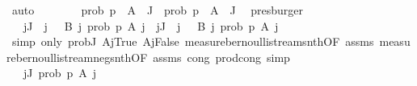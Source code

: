 \begin{isabellebody}
\ auto\isanewline
\ \ \ \ \ \ \isamarkupfalse%
\ {\isachardoublequoteopen}prob\ p\ {\isacharparenleft}{\kern0pt}{\isasymInter}\ {\isacharparenleft}{\kern0pt}A\ {\isacharbackquote}{\kern0pt}\ J{\isacharparenright}{\kern0pt}{\isacharparenright}{\kern0pt}\ {\isacharequal}{\kern0pt}\ prob\ p\ {\isacharparenleft}{\kern0pt}{\isasymInter}\ {\isacharparenleft}{\kern0pt}A\ {\isacharbackquote}{\kern0pt}\ J{\isacharprime}{\kern0pt}{\isacharparenright}{\kern0pt}{\isacharparenright}{\kern0pt}{\isachardoublequoteclose}\ \isamarkupfalse%
\ presburger\isanewline
\ \ \ \ \ \ \isamarkupfalse%
\ \isamarkupfalse%
\ {\isachardoublequoteopen}{\isachardot}{\kern0pt}{\isachardot}{\kern0pt}{\isachardot}{\kern0pt}\ {\isacharequal}{\kern0pt}\ {\isacharparenleft}{\kern0pt}{\isasymProd}j{\isasymin}J{\isacharprime}{\kern0pt}\ {\isasyminter}\ {\isacharbraceleft}{\kern0pt}j{\isachardot}{\kern0pt}\ {}\ {\isasymin}\ B\ j{\isacharbraceright}{\kern0pt}{\isachardot}{\kern0pt}\ prob\ p\ {\isacharparenleft}{\kern0pt}A\ j{\isacharparenright}{\kern0pt}{\isacharparenright}{\kern0pt}\ {\isacharasterisk}{\kern0pt}\ {\isacharparenleft}{\kern0pt}{\isasymProd}j{\isasymin}J{\isacharprime}{\kern0pt}\ {\isacharminus}{\kern0pt}\ {\isacharbraceleft}{\kern0pt}j{\isachardot}{\kern0pt}\ {}\ {\isasymin}\ B\ j{\isacharbraceright}{\kern0pt}{\isachardot}{\kern0pt}\ prob\ p\ {\isacharparenleft}{\kern0pt}A\ j{\isacharparenright}{\kern0pt}{\isacharparenright}{\kern0pt}{\isachardoublequoteclose}\ \isanewline
\ \ \ \ \ \ \ \ \isamarkupfalse%
\ {\isacharparenleft}{\kern0pt}simp\ only{\isacharcolon}{\kern0pt}\ prob{\isacharunderscore}{\kern0pt}J{\isacharprime}{\kern0pt}\ A{\isacharunderscore}{\kern0pt}j{\isacharunderscore}{\kern0pt}True\ A{\isacharunderscore}{\kern0pt}j{\isacharunderscore}{\kern0pt}False\ measure{\isacharunderscore}{\kern0pt}bernoulli{\isacharunderscore}{\kern0pt}stream{\isacharunderscore}{\kern0pt}snth{\isacharbrackleft}{\kern0pt}OF\ assms{\isacharbrackright}{\kern0pt}\ measure{\isacharunderscore}{\kern0pt}bernoulli{\isacharunderscore}{\kern0pt}stream{\isacharunderscore}{\kern0pt}neg{\isacharunderscore}{\kern0pt}snth{\isacharbrackleft}{\kern0pt}OF\ assms{\isacharbrackright}{\kern0pt}\ cong{\isacharcolon}{\kern0pt}\ prod{\isachardot}{\kern0pt}cong{\isacharparenright}{\kern0pt}\ simp\isanewline
\ \ \ \ \ \ \isamarkupfalse%
\ \isamarkupfalse%
\ {\isachardoublequoteopen}{\isachardot}{\kern0pt}{\isachardot}{\kern0pt}{\isachardot}{\kern0pt}\ {\isacharequal}{\kern0pt}\ {\isacharparenleft}{\kern0pt}{\isasymProd}j{\isasymin}J{\isacharprime}{\kern0pt}{\isachardot}{\kern0pt}\ prob\ p\ {\isacharparenleft}{\kern0pt}A\ j{\isacharparenright}{\kern0pt}{\isacharparenright}{\kern0pt}{\isachardoublequoteclose}\ \isamarkupfalse%

\end{isabellebody}
